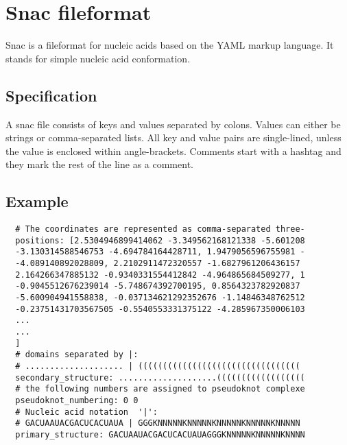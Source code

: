 \section{Snac fileformat}
Snac is a fileformat for nucleic acids based on the YAML markup language. It stands for simple nucleic acid conformation.
\subsection{Specification}
A snac file consists of keys and values separated by colons. Values can either be strings or comma-separated lists. All key and value pairs are single-lined, unless the value is enclosed within angle-brackets. Comments start with a hashtag and they mark the rest of the line as a comment.

\subsection{Example}
\begin{verbatim}
  # The coordinates are represented as comma-separated three-
  positions: [2.5304946899414062 -3.349562168121338 -5.601208
  -3.130314588546753 -4.694784164428711, 1.9479056596755981 -
  -4.089140892028809, 2.2102911472320557 -1.6827961206436157
  2.164266347885132 -0.9340331554412842 -4.964865684509277, 1
  -0.9045512676239014 -5.748674392700195, 0.8564323782920837
  -5.600904941558838, -0.037134621292352676 -1.14846348762512
  -0.23751431703567505 -0.5540553331375122 -4.285967350006103
  ...
  ...
  ]
  # domains separated by |:
  # .................... | (((((((((((((((((((((((((((((((((
  secondary_structure: ....................((((((((((((((((((
  # the following numbers are assigned to pseudoknot complexe
  pseudoknot_numbering: 0 0
  # Nucleic acid notation  '|':
  # GACUAAUACGACUCACUAUA | GGGKNNNNNKNNNNNKNNNNNKNNNNNKNNNNN
  primary_structure: GACUAAUACGACUCACUAUAGGGKNNNNNKNNNNNKNNNN
\end{verbatim}
